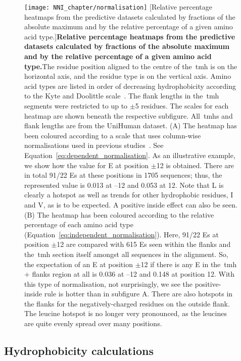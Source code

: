\begin{figure}[!ht]
\centering
\texttt{[image: NNI\_chapter/normalisation]}
[Relative percentage heatmaps from the predictive datasets calculated by fractions of the absolute maximum and by the relative percentage of a given amino acid type.]{\textbf{Relative percentage heatmaps from the predictive datasets calculated by fractions of the absolute maximum and by the relative percentage of a given amino acid type.}The residue position aligned to the centre of the~\gls{tmh} is on the horizontal axis, and the residue type is on the vertical axis.
Amino acid types are listed in order of decreasing hydrophobicity according to the Kyte and Doolittle scale~\cite{Kyte1982}.
The flank lengths in the~\gls{tmh} segments were restricted to up to $\pm$5 residues.
The scales for each heatmap are shown beneath the respective subfigure.
All~\gls{tmh}s and flank lengths are from the UniHuman dataset.
(A) The heatmap has been coloured according to a scale that uses column-wise normalisations used in previous studies~\cite{Sharpe2010}.
See Equation~\ref{eq:dependent_normalisation}.
As an illustrative example, we show how the value for E at position $\pm$12 is obtained.
There are in total 91/22 Es at these positions in 1705 sequences; thus, the represented value is 0.013 at –12 and 0.053 at 12.
Note that L is clearly a hotspot as well as trends for other hydrophobic residues, I and V, as is to be expected.
A positive inside effect can also be seen.
(B) The heatmap has been coloured according to the relative percentage of each amino acid type (Equation~\ref{eq:independent_normalisation}).
Here, 91/22 Es at position $\pm$12 are compared with 615 Es seen within the flanks and the~\gls{tmh} section itself amongst all sequences in the alignment.
So, the expectation of an E at position $\pm$12 if there is any E in the~\gls{tmh} + flanks region at all is 0.036 at –12 and 0.148 at position 12.
With this type of normalisation, not surprisingly, we see the positive-inside rule is hotter than in subfigure A.
There are also hotspots in the flanks for the negatively\--charged residues on the outside flank.
The leucine hotspot is no longer very pronounced, as the leucines are quite evenly spread over many positions.}

\label{fig:normalisation}
\end{figure}

\subsection{Hydrophobicity calculations}

